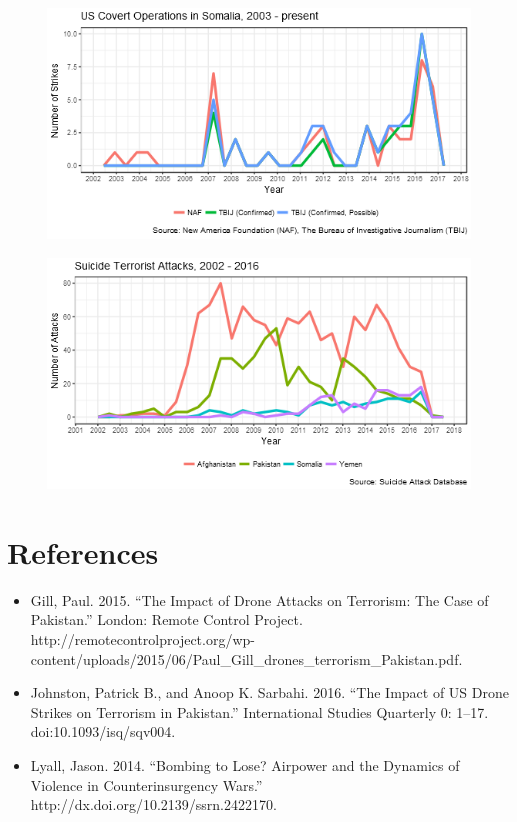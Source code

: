 \documentclass{beamer}
\begin{document}
  \begin{frame}
	\begin{figure}[h!]
		\includegraphics[width=\linewidth]{somalia_strikes.png}
	\end{figure}
  \end{frame}

 \begin{frame}
	\begin{figure}[h!]
		\includegraphics[width=\linewidth]{suicide_attacks.png}
	\end{figure}
  \end{frame}

\section{References}

 \begin{frame}
    \begin{itemize}
	\item Gill, Paul. 2015. “The Impact of Drone Attacks on Terrorism: The Case of Pakistan.” London: Remote Control Project. http://remotecontrolproject.org/wp-content/uploads/2015/06/Paul\_Gill\_drones\_terrorism\_Pakistan.pdf.
	\item Johnston, Patrick B., and Anoop K. Sarbahi. 2016. “The Impact of US Drone Strikes on Terrorism in Pakistan.” International Studies Quarterly 0: 1–17. doi:10.1093/isq/sqv004.
        \item Lyall, Jason. 2014. “Bombing to Lose? Airpower and the Dynamics of Violence in Counterinsurgency Wars.” http://dx.doi.org/10.2139/ssrn.2422170.
     \end{itemize}
  \end{frame}
\end{document}

